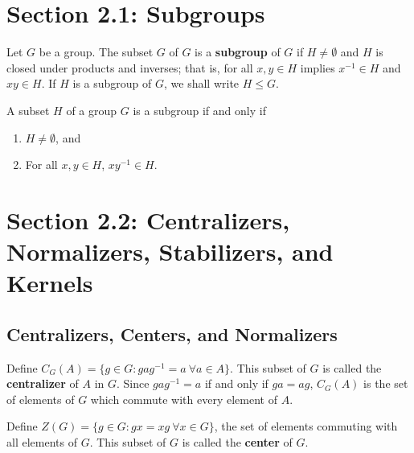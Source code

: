 \section{Section 2.1: Subgroups}

\begin{definition}[Subgroup]
   Let \( G  \) be a group. The subset \( G  \) of \( G  \) is a \textbf{subgroup} of \( G  \) if \( H \neq \emptyset  \) and \( H  \) is closed under products and inverses; that is, for all \( x, y \in H  \) implies \( x^{-1} \in H  \) and \( x y \in H  \). If \( H  \) is a subgroup of \( G  \), we shall write \( H \leq G  \). 
\end{definition}    

\begin{definition}
   A subset \( H  \) of a group \( G  \) is a subgroup if and only if  
   \begin{enumerate}
       \item[(1)] \( H \neq \emptyset \), and
       \item[(2)] For all \( x,y \in H  \), \( x y^{-1} \in H  \).
   \end{enumerate}
\end{definition}


\section{Section 2.2: Centralizers, Normalizers, Stabilizers, and Kernels}

\subsection{Centralizers, Centers, and Normalizers}

\begin{definition}[Centralizer]
   Define \( {C}_{G}(A) = \{ g \in G : g a g^{-1} = a \ \forall a \in A  \}  \). This subset of \( G  \) is called the \textbf{centralizer} of \( A  \) in \( G  \). Since \( g a g^{-1} = a  \) if and only if \( ga = ag  \), \( {C}_{G}(A) \) is the set of elements of \( G  \) which commute with every element of \( A  \).
\end{definition}

\begin{definition}[Center]
    Define \( Z(G) = \{  g \in G : gx = xg \ \forall x \in G  \}  \), the set of elements commuting with all elements of \( G  \). This subset of \( G  \) is called the \textbf{center} of \( G  \).
\end{definition}



